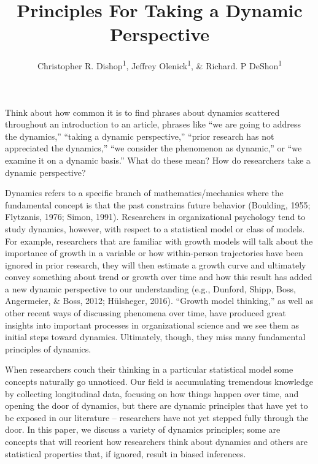 \documentclass[english,,man]{apa6}
\title{Principles For Taking a Dynamic Perspective}
\author{Christopher R. Dishop\textsuperscript{1}, Jeffrey
Olenick\textsuperscript{1}, \& Richard. P DeShon\textsuperscript{1}}
\date{}
\affiliation{
\vspace{0.5cm}
\textsuperscript{1} Michigan State University}
\theoremstyle{definition}
\theoremstyle{definition}
\theoremstyle{definition}
\theoremstyle{remark}
\begin{document}
\maketitle

Think about how common it is to find phrases about dynamics scattered
throughout an introduction to an article, phrases like \enquote{we are
going to address the dynamics,} \enquote{taking a dynamic perspective,}
\enquote{prior research has not appreciated the dynamics,} \enquote{we
consider the phenomenon as dynamic,} or \enquote{we examine it on a
dynamic basis.} What do these mean? How do researchers take a dynamic
perspective?

Dynamics refers to a specific branch of mathematics/mechanics where the
fundamental concept is that the past constrains future behavior
(Boulding, 1955; Flytzanis, 1976; Simon, 1991). Researchers in
organizational psychology tend to study dynamics, however, with respect
to a statistical model or class of models. For example, researchers that
are familiar with growth models will talk about the importance of growth
in a variable or how within-person trajectories have been ignored in
prior research, they will then estimate a growth curve and ultimately
convey something about trend or growth over time and how this result has
added a new dynamic perspective to our understanding (e.g., Dunford,
Shipp, Boss, Angermeier, \& Boss, 2012; Hülsheger, 2016).
\enquote{Growth model thinking,} as well as other recent ways of
discussing phenomena over time, have produced great insights into
important processes in organizational science and we see them as initial
steps toward dynamics. Ultimately, though, they miss many fundamental
principles of dynamics.

When researchers couch their thinking in a particular statistical model
some concepts naturally go unnoticed. Our field is accumulating
tremendous knowledge by collecting longitudinal data, focusing on how
things happen over time, and opening the door of dynamics, but there are
dynamic principles that have yet to be exposed in our literature --
researchers have not yet stepped fully through the door. In this paper,
we discuss a variety of dynamics principles; some are concepts that will
reorient how researchers think about dynamics and others are statistical
properties that, if ignored, result in biased inferences.
\end{document}
